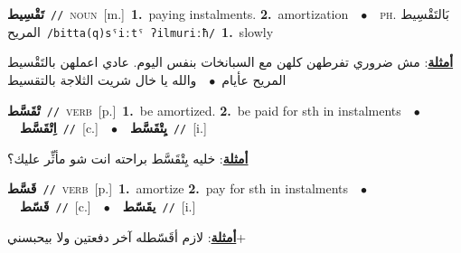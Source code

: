 \documentclass[10pt,a4paper,twoside]{article} %
\begin{document}
\begin{multicols}{2}
{\setlength\topsep{0pt}\textbf{\foreignlanguage{arabic}{تَقْسِيط}}\ {\color{gray}\texttt{//}\color{black}}\ \textsc{noun}\ [m.]\ \textbf{1.}~paying instalments.  \textbf{2.}~amortization\ \ $\bullet$\ \ \textsc{ph.} \color{gray} \foreignlanguage{arabic}{بَالتَقْسِيط المريح}\color{black}\ {\color{gray}\texttt{/{\sffamily bitta(q)sˤiːtˤ ʔilmuriːħ}/}\color{black}}\ \textbf{1.}~slowly\  \begin{flushright}\color{gray}\foreignlanguage{arabic}{\textbf{\underline{\foreignlanguage{arabic}{أمثلة}}}: مش ضروري تفرطهن كلهن مع السبانخات بنفس اليوم. عادي اعملهن بالتَقْسيط المريح عأيام\ $\bullet$\ \  والله يا خال شريت الثلاجة بالتقسيط}\end{flushright}\color{black}} \vspace{2mm}

{\setlength\topsep{0pt}\textbf{\foreignlanguage{arabic}{تْقَسَّط}}\ {\color{gray}\texttt{//}\color{black}}\ \textsc{verb}\ [p.]\ \textbf{1.}~be amortized.  \textbf{2.}~be paid for sth in instalments\ \ $\bullet$\ \ \setlength\topsep{0pt}\textbf{\foreignlanguage{arabic}{اِتْقَسَّط}}\ {\color{gray}\texttt{//}\color{black}}\ [c.]\ \ $\bullet$\ \ \setlength\topsep{0pt}\textbf{\foreignlanguage{arabic}{يِتْقَسَّط}}\ {\color{gray}\texttt{//}\color{black}}\ [i.]\  \begin{flushright}\color{gray}\foreignlanguage{arabic}{\textbf{\underline{\foreignlanguage{arabic}{أمثلة}}}: خليه يِتْقَسَّط براحته انت شو مأثِّر عليك؟}\end{flushright}\color{black}} \vspace{2mm}

{\setlength\topsep{0pt}\textbf{\foreignlanguage{arabic}{قَسَّط}}\ {\color{gray}\texttt{//}\color{black}}\ \textsc{verb}\ [p.]\ \textbf{1.}~amortize  \textbf{2.}~pay for sth in instalments\ \ $\bullet$\ \ \setlength\topsep{0pt}\textbf{\foreignlanguage{arabic}{قَسّط}}\ {\color{gray}\texttt{//}\color{black}}\ [c.]\ \ $\bullet$\ \ \setlength\topsep{0pt}\textbf{\foreignlanguage{arabic}{يقَسّط}}\ {\color{gray}\texttt{//}\color{black}}\ [i.]\  \begin{flushright}\color{gray}\foreignlanguage{arabic}{\textbf{\underline{\foreignlanguage{arabic}{أمثلة}}}: لازم أقَسّطله آخر دفعتين ولا بيحبسني+}\end{flushright}\color{black}} \vspace{2mm}


\end{multicols}
\end{document}
